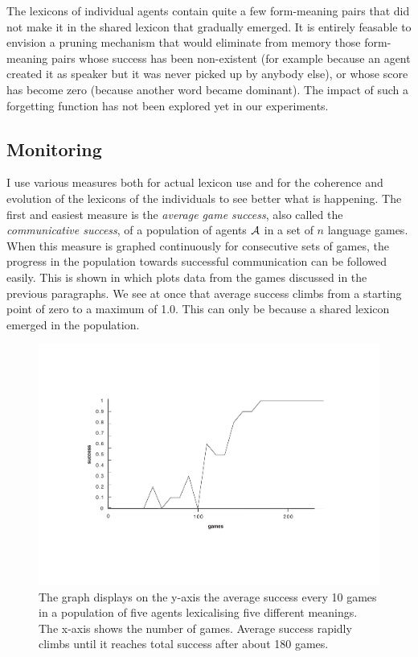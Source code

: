 The lexicons of individual agents contain quite a few form-meaning
pairs that did not make it in the shared lexicon that gradually 
emerged. It is entirely feasable to envision a pruning mechanism 
that would eliminate from memory those form-meaning pairs whose 
success has been non-existent (for example because an agent created
it as speaker but it was never picked up by anybody else), 
or whose score has become zero (because another word became
dominant). The impact of such a forgetting
function has not been explored yet in our experiments. 

\subsection{Monitoring} 

I use various measures both for actual lexicon use and for 
the coherence and evolution of the lexicons of
the individuals to see better what is happening. 
The first and easiest measure is the {\itshape average game success}, 
also called the {\itshape communicative success}, 
of a population of agents ${\cal A}$ in a set of $n$ language games. 
When this measure is graphed continuously for consecutive sets of 
games, the progress in the population
towards successful communication can be followed easily. This
is shown in  which plots data from the 
games discussed in the previous paragraphs. We see at once that
average success climbs from a starting point of zero
to a maximum of 1.0. This can only be because a shared lexicon 
emerged in the population. 

\begin{figure}[htbp]
  \centerline{\includegraphics[width=\textwidth]{chap5/figs/success.pdf}}
\caption{\label{success} 
The graph displays on the y-axis the average success every 10 games
in a population of five agents lexicalising five
different meanings. The x-axis 
shows the number of games. Average success
rapidly climbs until it reaches total success after 
about 180 games.}
\end{figure}


